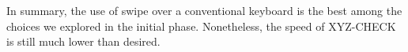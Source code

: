 In summary, the use of swipe over a conventional keyboard is the best among the choices we explored in the initial phase.  Nonetheless, the speed of XYZ-CHECK is still much lower than desired. 


\begin{comment}
>
\subsection{Design \#4 - 8-key Drag}
\vspace*{.1cm}
\texttt{[image: figures/26Tap]}

QWERTY keyboard is broken into 8 regions instead of 6.
User interact with this keyboard through dragging.
Both hands are required, with each hand dragging four directions (left, up, right, down) to input the 8 regions.

\subsection{Design \#5 - 6-key Tap}
\vspace*{.1cm}
\texttt{[image: figures/26Tap]}

This is our first design utilizing batched keys. QWERTY keyboard is divided into 6 sections. Tapping corresponding regions triggers input for a whole section.
A word recommender algorithm in back end is required.


\subsection{Design \#6 - 6-key Drag}
\vspace*{.1cm}
\texttt{[image: figures/26Tap]}

Similar to 6 keys tap, the method of interaction is changed to drag instead of tap.
A word recommender algorithm in back end is required.

Even though there can be realistic representation of the keyboard and his fingers in VR, users still suffer from not being able to see some part of his own body.
The solution to such visual segmentation is not apparent, for whole body tracking in VR is not yet available.

Studies show that users possesses approximate knowledge of where their fingers are on screen thanks to proprioception \cite{boff1986handbook}.

\section{Design Goals}
Before describing the prototypes and lessons learned, we present five high-level design goals that focus on input metrics, user experience, and adaptability.
These goals are informed by related work and our experience building other systems.


\end{comment}
